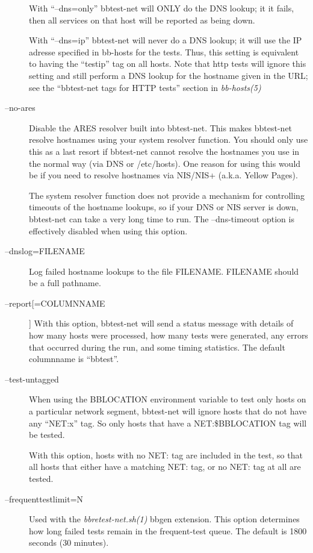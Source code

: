 \begin{description}
 With ``--dns=only'' bbtest-net will ONLY do the DNS lookup; it it
 fails, then all services on that host will be reported as being down.  

 With ``--dns=ip'' bbtest-net will never do a DNS lookup; it will use
 the IP adresse specified in bb-hosts for the tests. Thus, this
 setting is equivalent to having the ``testip'' tag on all hosts. Note
 that http tests will ignore this setting and still perform a DNS
 lookup for the hostname given in the URL; see the ``bbtest-net tags
 for HTTP tests'' section in \emph{bb-hosts(5)}

\item[--no-ares] Disable the ARES resolver built into bbtest-net. This
  makes bbtest-net resolve hostnames using your system resolver
  function. You should only use this as a last resort if bbtest-net
  cannot resolve the hostnames you use in the normal way (via DNS or
  /etc/hosts). One reason for using this would be if you need to
  resolve hostnames via NIS/NIS+ (a.k.a. Yellow Pages).  

 The system resolver function does not provide a mechanism for
 controlling timeouts of the hostname lookups, so if your DNS or NIS
 server is down, bbtest-net can take a very long time to run. The
 --dns-timeout option is effectively disabled when using this option. 
 

\item[--dnslog=FILENAME] Log failed hostname lookups to the file
  FILENAME. FILENAME should be a full pathname. 

\item[--report[=COLUMNNAME]] With this option, bbtest-net will send a
  status message with details of how many hosts were processed, how
  many tests were generated, any errors that occurred during the run,
  and some timing statistics. The default columnname is ``bbtest''. 

\item[--test-untagged] When using the BBLOCATION environment variable
  to test only hosts on a particular network segment, bbtest-net will
  ignore hosts that do not have any ``NET:x'' tag. So only hosts that
  have a NET:\$BBLOCATION tag will be tested.  

 With this option, hosts with no NET: tag are included in the test, so
 that all hosts that either have a matching NET: tag, or no NET: tag
 at all are tested. 

 

\item[--frequenttestlimit=N] Used with the \emph{bbretest-net.sh(1)}
 bbgen extension. This option determines how long failed tests remain
 in the frequent-test queue. The default is 1800 seconds (30
 minutes). 



\end{description}
